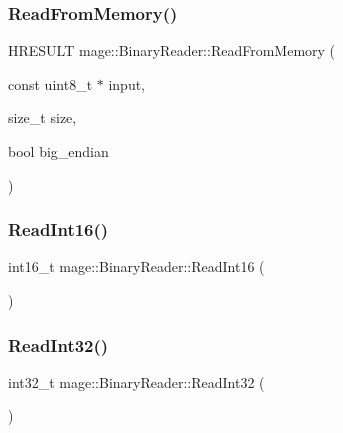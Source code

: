 \hypertarget{classmage_1_1_binary_reader_ac0bf066e76b7ac0f5308109ae431007d}{}\label{classmage_1_1_binary_reader_ac0bf066e76b7ac0f5308109ae431007d} 
\subsubsection{\texorpdfstring{Read\+From\+Memory()}{ReadFromMemory()}}
{\footnotesize\ttfamily H\+R\+E\+S\+U\+LT mage\+::\+Binary\+Reader\+::\+Read\+From\+Memory (\begin{DoxyParamCaption}\item[{const uint8\+\_\+t $\ast$}]{input,  }\item[{size\+\_\+t}]{size,  }\item[{bool}]{big\+\_\+endian }\end{DoxyParamCaption})}

\hypertarget{classmage_1_1_binary_reader_abb90a96c485b3acb1af3bb3bd88b76c5}{}\label{classmage_1_1_binary_reader_abb90a96c485b3acb1af3bb3bd88b76c5} 
\subsubsection{\texorpdfstring{Read\+Int16()}{ReadInt16()}}
{\footnotesize\ttfamily int16\+\_\+t mage\+::\+Binary\+Reader\+::\+Read\+Int16 (\begin{DoxyParamCaption}{ }\end{DoxyParamCaption})\hspace{0.3cm}{\ttfamily [protected]}}

\hypertarget{classmage_1_1_binary_reader_a8a463e4e5469e90246a40f2898abbc67}{}\label{classmage_1_1_binary_reader_a8a463e4e5469e90246a40f2898abbc67} 
\subsubsection{\texorpdfstring{Read\+Int32()}{ReadInt32()}}
{\footnotesize\ttfamily int32\+\_\+t mage\+::\+Binary\+Reader\+::\+Read\+Int32 (\begin{DoxyParamCaption}{ }\end{DoxyParamCaption})\hspace{0.3cm}{\ttfamily [protected]}}

